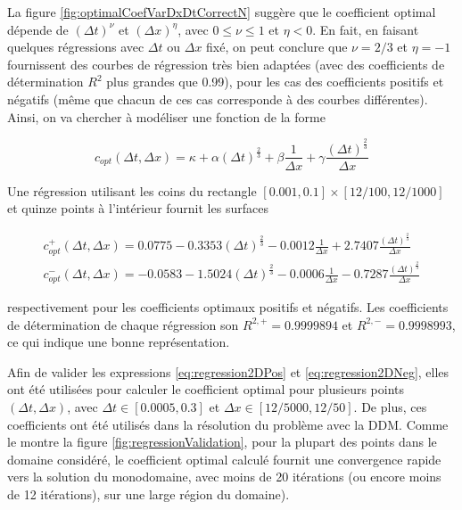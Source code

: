 \indent La figure \ref{fig:optimalCoefVarDxDtCorrectN} suggère que le coefficient optimal dépende de $(\Delta t)^\nu$ et $(\Delta x)^\eta$, avec $0 \leq \nu \leq 1$ et $\eta < 0$. En fait, en faisant quelques régressions avec $\Delta t $ ou $\Delta x$ fixé, on peut conclure que $\nu = 2/3$ et $\eta = -1$ fournissent des courbes de régression très bien adaptées (avec des coefficients de détermination $R^2$ plus grandes que 0.99), pour les cas des coefficients positifs et négatifs (même que chacun de ces cas corresponde à des courbes différentes). Ainsi, on va chercher à modéliser une fonction de la forme

\begin{equation}
	\label{eq:regression2D}
	c_{opt}(\Delta t, \Delta x) = \kappa + \alpha (\Delta t)^{\frac{2}{3}} + \beta \frac{1}{\Delta x} + \gamma   \frac{(\Delta t)^{\frac{2}{3}}}{\Delta x}
\end{equation}

\indent Une régression utilisant les coins du rectangle $[0.001,0.1]\times[12/100,12/1000]$ et quinze points à l'intérieur fournit les surfaces 

\begin{gather}
	c_{opt}^+(\Delta t, \Delta x) = 0.0775 -0.3353 (\Delta t)^{\frac{2}{3}} - 0.0012 \frac{1}{\Delta x} + 2.7407   \frac{(\Delta t)^{\frac{2}{3}}}{\Delta x} 	\label{eq:regression2DPos} \\
	c_{opt}^-(\Delta t, \Delta x) = -0.0583 -1.5024 (\Delta t)^{\frac{2}{3}} - 0.0006 \frac{1}{\Delta x} -0.7287  \frac{(\Delta t)^{\frac{2}{3}}}{\Delta x} 	\label{eq:regression2DNeg}
\end{gather}

\noindent respectivement pour les coefficients optimaux positifs et négatifs. Les coefficients de détermination de chaque régression son $R^{2,+} = 0.9999894$ et $R^{2,-} = 0.9998993$, ce qui indique une bonne représentation.

\indent Afin de valider les expressions \eqref{eq:regression2DPos} et \eqref{eq:regression2DNeg}, elles ont été utilisées pour calculer le coefficient optimal pour plusieurs points $(\Delta t, \Delta x)$, avec $\Delta t \in [0.0005,0.3]$ et $\Delta x \in \left[12/5000,12/50 \right]$. De plus, ces coefficients ont été utilisés dans la résolution du problème avec la DDM. Comme le montre la figure \ref{fig:regressionValidation}, pour la plupart des points dans le domaine considéré, le coefficient optimal calculé fournit une convergence rapide vers la solution du monodomaine, avec moins de 20 itérations (ou encore moins de 12 itérations), sur une large région du domaine).


